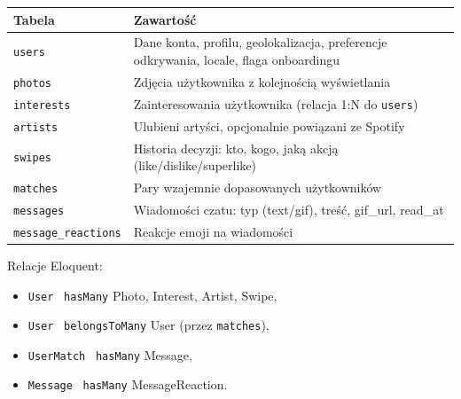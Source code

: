 \documentclass[12pt,a4paper]{article}
\begin{document}
\begin{longtable}{|p{3.8cm}|p{9.4cm}|}
\hline
\textbf{Tabela} & \textbf{Zawartość} \\
\hline
\texttt{users} & Dane konta, profilu, geolokalizacja, preferencje odkrywania, locale, flaga onboardingu \\
\hline
\texttt{photos} & Zdjęcia użytkownika z kolejnością wyświetlania \\
\hline
\texttt{interests} & Zainteresowania użytkownika (relacja 1:N do \texttt{users}) \\
\hline
\texttt{artists} & Ulubieni artyści, opcjonalnie powiązani ze Spotify \\
\hline
\texttt{swipes} & Historia decyzji: kto, kogo, jaką akcją (like/dislike/superlike) \\
\hline
\texttt{matches} & Pary wzajemnie dopasowanych użytkowników \\
\hline
\texttt{messages} & Wiadomości czatu: typ (text/gif), treść, gif\_url, read\_at \\
\hline
\texttt{message\_reactions} & Reakcje emoji na wiadomości \\
\hline
\end{longtable}

Relacje Eloquent:
\begin{itemize}
    \item \texttt{User} \textrightarrow\ \texttt{hasMany} Photo, Interest, Artist, Swipe,
    \item \texttt{User} \textrightarrow\ \texttt{belongsToMany} User (przez \texttt{matches}),
    \item \texttt{UserMatch} \textrightarrow\ \texttt{hasMany} Message,
    \item \texttt{Message} \textrightarrow\ \texttt{hasMany} MessageReaction.
\end{itemize}
\end{document}
